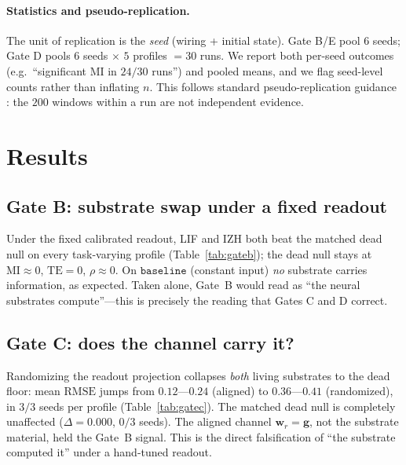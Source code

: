 \documentclass[10pt,a4paper]{article}
\newcommand{\RMSE}{\ensuremath{\mathrm{RMSE}}}
\newcommand{\MI}{\ensuremath{\mathrm{MI}}}
\newcommand{\TE}{\ensuremath{\mathrm{TE}}}
\begin{document}
\paragraph{Statistics and pseudo-replication.} The unit of replication
is the \emph{seed} (wiring + initial state). Gate B/E pool $6$ seeds;
Gate D pools $6$ seeds $\times$ $5$ profiles $=30$ runs. We report both
per-seed outcomes (e.g.\ ``significant MI in $24/30$ runs'') and pooled
means, and we flag seed-level counts rather than inflating $n$. This
follows standard pseudo-replication guidance \cite{hurlbert1984}: the
$200$ windows within a run are not independent evidence.

\section{Results}\label{sec:results}

\subsection{Gate B: substrate swap under a fixed readout}\label{sec:gateb}
\begin{table}[H]
\centering
\caption{Gate B: per-profile $\widehat{\RMSE}$, $\MI$, $\rho$ and
$\TE$-significance under the fixed calibrated readout (5 profiles,
6 seeds). ``msd'' is the across-seed mean.}
\label{tab:gateb}

\end{table}
Under the fixed calibrated readout, LIF and IZH both beat the matched
dead null on every task-varying profile (Table~\ref{tab:gateb});
the dead null stays at $\MI\approx0$, $\TE=0$, $\rho\approx0$. On
$\mathtt{baseline}$ (constant input) \emph{no} substrate carries
information, as expected. Taken alone, Gate~B would read as ``the
neural substrates compute''---this is precisely the reading that Gates
C and D correct.

\subsection{Gate C: does the channel carry it?}\label{sec:gatecres}
\begin{table}[H]
\centering
\caption{Gate C: canonical $\RMSE$ under the aligned channel
($\mathbf{w}_r=\mathbf{g}$) vs.\ per-seed random readouts. ``$d$'' is
$\RMSE_{\mathrm{random}}-\RMSE_{\mathrm{aligned}}$; ``paired'' is the
fraction of seeds with $d>0$. Both living substrates collapse
(3/3 seeds); the matched dead null is unaffected.}
\label{tab:gatec}

\end{table}
Randomizing the readout projection collapses \emph{both} living
substrates to the dead floor: mean $\RMSE$ jumps from $0.12$---$0.24$
(aligned) to $0.36$---$0.41$ (randomized), in $3/3$ seeds per profile
(Table~\ref{tab:gatec}). The matched dead null is completely
unaffected ($\Delta=0.000$, $0/3$ seeds). The aligned channel
$\mathbf{w}_r=\mathbf{g}$, not the substrate material, held the Gate~B
signal. This is the direct falsification of ``the substrate computed
it'' under a hand-tuned readout.
\end{document}
